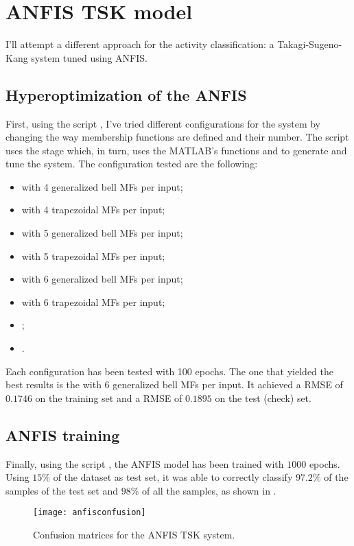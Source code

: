 \section{ANFIS TSK model}\label{sec:fuzzyanfis}

I'll attempt a different approach for the activity classification: a
Takagi-Sugeno-Kang system tuned using ANFIS.

\subsection{Hyperoptimization of the ANFIS}

First, using the script , I've tried different
configurations for the system by changing the way membership functions are
defined and their number. The script uses the  stage which,
in turn, uses the MATLAB's functions  and  to generate
and tune the system. The configuration tested are the following:
\begin{itemize}
	\item {} with 4 generalized bell MFs per input;
	\item {} with 4 trapezoidal MFs per input;
	\item {} with 5 generalized bell MFs per input;
	\item {} with 5 trapezoidal MFs per input;
	\item {} with 6 generalized bell MFs per input;
	\item {} with 6 trapezoidal MFs per input;
	\item {};
	\item {}.
\end{itemize}

Each configuration has been tested with 100 epochs. The one that yielded the
best results is the  with 6 generalized bell MFs per
input. It achieved a RMSE of \(0.1746\) on the training set and a RMSE of
\(0.1895\) on the test (check) set.

\subsection{ANFIS training}

Finally, using the script , the ANFIS model has been trained
with \(1000\) epochs. Using \(15\%\) of the dataset as test set, it was able to
correctly classify \(97.2\%\) of the samples of the test set and \(98\%\) of
all the samples, as shown in .

\begin{figure}[htbp]
	\centering
	\texttt{[image: anfisconfusion]}
	\caption{Confusion matrices for the ANFIS TSK
	system.}\label{fig:anfisconfusion}
\end{figure}
